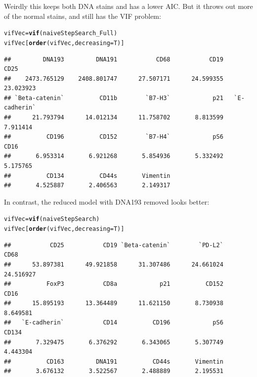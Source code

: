 \documentclass[a4paper]{article}\usepackage[]{graphicx}\usepackage[]{color}
\makeatletter
\newcommand{\hlstd}[1]{\textcolor[rgb]{0.345,0.345,0.345}{#1}}%
\newcommand{\hlkwb}[1]{\textcolor[rgb]{0.69,0.353,0.396}{#1}}%
\newcommand{\hlkwc}[1]{\textcolor[rgb]{0.333,0.667,0.333}{#1}}%
\newcommand{\hlkwd}[1]{\textcolor[rgb]{0.737,0.353,0.396}{\textbf{#1}}}%
\newenvironment{kframe}{%
 \def\at@end@of@kframe{}%
 \ifinner\ifhmode%
  \def\at@end@of@kframe{\end{minipage}}%
  \begin{minipage}{\columnwidth}%
 \fi\fi%
 \def\FrameCommand##1{\hskip\@totalleftmargin \hskip-\fboxsep
 \colorbox{shadecolor}{##1}\hskip-\fboxsep
     \hskip-\linewidth \hskip-\@totalleftmargin \hskip\columnwidth}%
 \MakeFramed {\advance\hsize-\width
   \@totalleftmargin\z@ \linewidth\hsize
   \@setminipage}}%
 {\par\unskip\endMakeFramed%
 \at@end@of@kframe}
\newenvironment{knitrout}{}{} %
\makeatother
\begin{document}
Weirdly this keeps both DNA stains and has a lower AIC. But it throws out more of the normal stains, and still has the VIF problem:
\begin{knitrout}
\color{fgcolor}\begin{kframe}
\begin{alltt}
\hlstd{vifVec} \hlkwb{=} \hlkwd{vif}\hlstd{(naiveStepSearch_Full)}
\hlstd{vifVec[}\hlkwd{order}\hlstd{(vifVec,}\hlkwc{decreasing}\hlstd{=T)]}
\end{alltt}
\begin{verbatim}
##         DNA193         DNA191           CD68           CD19           CD25 
##    2473.765129    2408.801747      27.507171      24.599355      23.023923 
## `Beta-catenin`          CD11b        `B7-H3`            p21   `E-cadherin` 
##      21.793794      14.012134      11.758702       8.813599       7.911414 
##          CD196          CD152        `B7-H4`            pS6           CD16 
##       6.953314       6.921268       5.854936       5.332492       5.175765 
##          CD134          CD44s       Vimentin 
##       4.525887       2.406563       2.149317
\end{verbatim}
\end{kframe}
\end{knitrout}

In contrast, the reduced model with DNA193 removed looks better:
\begin{knitrout}
\color{fgcolor}\begin{kframe}
\begin{alltt}
\hlstd{vifVec} \hlkwb{=} \hlkwd{vif}\hlstd{(naiveStepSearch)}
\hlstd{vifVec[}\hlkwd{order}\hlstd{(vifVec,}\hlkwc{decreasing}\hlstd{=T)]}
\end{alltt}
\begin{verbatim}
##           CD25           CD19 `Beta-catenin`        `PD-L2`           CD68 
##      53.897381      49.921858      31.307486      24.661024      24.516927 
##          FoxP3           CD8a            p21          CD152           CD16 
##      15.895193      13.364489      11.621150       8.730938       8.649581 
##   `E-cadherin`           CD14          CD196            pS6          CD134 
##       7.329475       6.376292       6.343065       5.307749       4.443304 
##          CD163         DNA191          CD44s       Vimentin 
##       3.676132       3.522567       2.488889       2.195531
\end{verbatim}
\end{kframe}
\end{knitrout}
\end{document}
